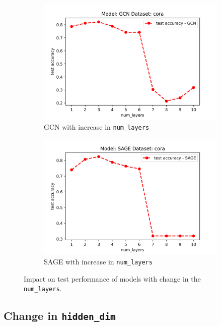 \documentclass[11pt]{article}
\begin{document}
    \begin{figure}[H]
        \centering
        \begin{subfigure}{0.5\linewidth}
            \includegraphics[width=1\linewidth]{GCN_numlayers.png}
            \caption{GCN with increase in \texttt{num\_layers}}
        \end{subfigure}%
        \begin{subfigure}{0.5\linewidth}
            \includegraphics[width=1\linewidth]{SAGE_numlayers.png}
            \caption{SAGE with increase in \texttt{num\_layers}}
        \end{subfigure}
        \caption{Impact on test performance of models with change in the \texttt{num\_layers}.}
    \end{figure}
    
    \subsection{Change in \texttt{hidden\_dim}}
    
\end{document}
